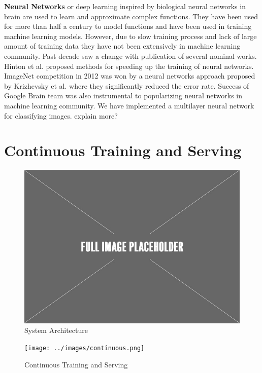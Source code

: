 \documentclass{sig-alternate-05-2015}
\begin{document}
\textbf{Neural Networks} or deep learning inspired by biological neural networks in brain are used to learn and approximate complex functions. 
They have been used for more than half a century to model functions and have been used in training machine learning models.
However, due to slow training process and lack of large amount of training data they have not been extensively in machine learning community.
Past decade saw a change with publication of several nominal works.
Hinton et al. \cite{hinton2006fast} proposed methods for speeding up the training of neural networks.
ImageNet competition \cite{ILSVRC15} in 2012 was won by a neural networks approach proposed by Krizhevsky et al. \cite{krizhevsky2012imagenet} where they significantly reduced the error rate. 
Success of Google Brain team \cite{sutskever2014sequence, mikolov2013efficient} was also instrumental to popularizing neural networks in machine learning community.
We have implemented a multilayer neural network for classifying images. {\color{red}explain more?}

\section{Continuous Training and Serving} \label{continious-training-serving}

\begin{figure}[h]
\centering
\includegraphics[scale=0.30]{../images/placeholder.jpeg}
\caption{System Architecture}
\label{fig:system-architecture}
\end{figure}

\begin{figure}[h]
\centering
\texttt{[image: ../images/continuous.png]}
\caption{Continuous Training and Serving}
\label{fig:cont-training-serving}
\end{figure}
\end{document}
